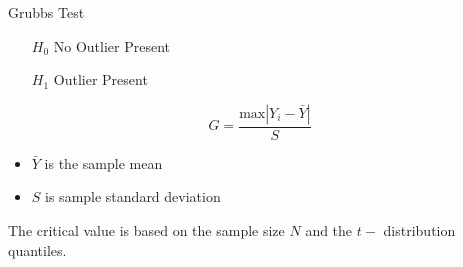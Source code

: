 Grubbs Test

\begin{itemize}
\item[$H_0$] No Outlier Present
\item[$H_1$] Outlier Present
\end{itemize}


\[ G = \frac{\mbox{max}|Y_i-\bar{Y}|}{S} \]

\begin{itemize}
\item $\bar{Y}$ is the sample mean
\item $S$ is sample standard deviation
\end{itemize}

The critical value is based on the sample size $N$ and the $t-$ distribution quantiles.
